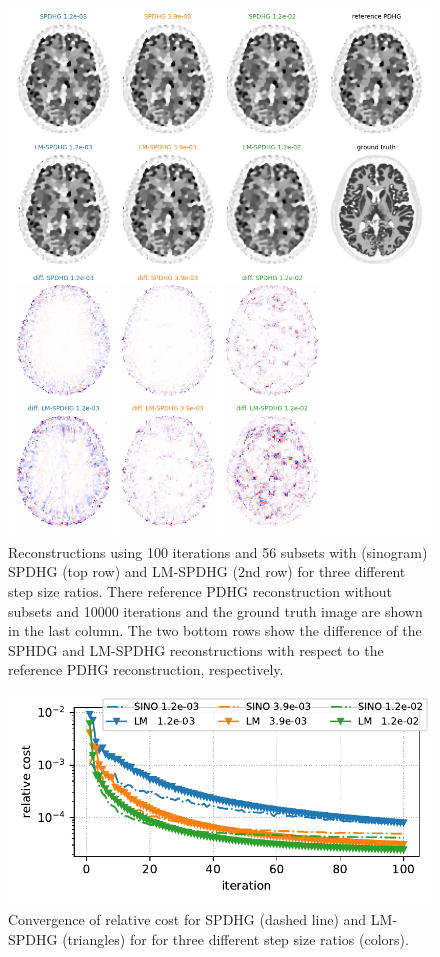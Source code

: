 \documentclass{IEEEtran}
\begin{document}
\begin{figure}[t]
\centerline{\includegraphics[width=1.0\columnwidth]{./figs/brain2d_counts_1.0E+06_beta_2.0E-03_niter_10000_100_nsub_56_precond_False.png}}
\caption{Reconstructions using 100 iterations and 56 subsets with (sinogram) SPDHG (top row) and 
LM-SPDHG (2nd row) for three different step size ratios. 
There reference PDHG reconstruction without subsets and 10000 iterations and
the ground truth image are shown in the last column. 
The two bottom rows show the difference of the SPHDG and LM-SPDHG reconstructions with respect
to the reference PDHG reconstruction, respectively.}
\label{fig:recons}
\end{figure}

\begin{figure}[t]
\centerline{\includegraphics[width=0.8\columnwidth]{./figs/brain2d_counts_1.0E+06_beta_2.0E-03_niter_10000_100_nsub_56_precond_False_metrics.pdf}}
\caption{Convergence of relative cost for SPDHG (dashed line) and LM-SPDHG (triangles) 
for for three different step size ratios (colors).}
\label{fig:cost}
\end{figure}
\end{document}
